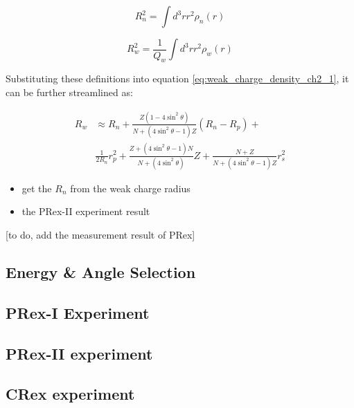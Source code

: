 \begin{equation}
R^2_n = \int d^3rr^2\rho_n(r)
\end{equation}

\begin{equation}
R^2_w = \frac{1}{Q_w}\int d^3rr^2\rho_w(r)
\end{equation}

Substituting these definitions into equation \ref{eq:weak_charge_density_ch2_1}, it can be further streamlined as:

\begin{equation}
\begin{split}
R_w & \approx R_n + \frac{Z(1-4\sin^2{\theta})}{N + (4\sin^2{\theta} -1)Z}(R_n - R_p) + \\
& \frac{1}{2R_n}{r_p^2 + \frac{Z + (4\sin^2{\theta} - 1)N}{N + (4\sin^2{\theta})}Z + \frac{N + Z}{N + (4\sin^2{\theta} -1 )Z}r_s^2}
\end{split}
\end{equation}

\begin{itemize}
    \item get the $R_n$ from the weak charge radius
    \item the PRex-II experiment result 
    
\end{itemize}


[to do, add the measurement result of PRex]
\subsection{Energy \& Angle Selection}


\subsection{PRex-I Experiment}
\subsection{PRex-II experiment}
\subsection{CRex experiment}





